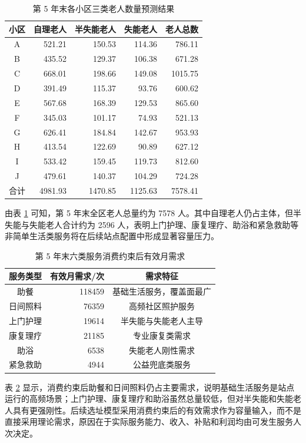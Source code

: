 \begin{table}[H]
\centering
\caption{第 5 年末各小区三类老人数量预测结果}
\label{tab:pop5}
\begin{tabular}{c r r r r}
\toprule
小区 & 自理老人 & 半失能老人 & 失能老人 & 老人总数 \\
\midrule
A & 521.21 & 150.53 & 114.36 & 786.11 \\
B & 435.52 & 129.37 & 106.38 & 671.28 \\
C & 668.01 & 198.66 & 149.08 & 1015.75 \\
D & 391.49 & 115.37 & 93.76 & 600.62 \\
E & 567.68 & 168.39 & 129.53 & 865.60 \\
F & 345.03 & 101.17 & 74.93 & 521.13 \\
G & 626.41 & 184.84 & 142.67 & 953.93 \\
H & 413.54 & 122.69 & 90.89 & 627.12 \\
I & 533.42 & 159.45 & 119.73 & 812.60 \\
J & 479.61 & 140.37 & 104.29 & 724.28 \\
\midrule
合计 & 4981.93 & 1470.85 & 1125.63 & 7578.41 \\
\bottomrule
\end{tabular}
\end{table}

由表 \ref{tab:pop5} 可知，第 5 年末全区老人总量约为 7578 人。其中自理老人仍占主体，但半失能与失能老人合计约为 2596 人，表明上门护理、康复理疗、助浴和紧急救助等非简单生活类服务将在后续站点配置中形成显著容量压力。

\begin{table}[H]
\centering
\caption{第 5 年末六类服务消费约束后有效月需求}
\label{tab:demand_summary}
\begin{tabular}{c r c}
\toprule
服务类型 & 有效月需求/次 & 需求特征 \\
\midrule
助餐 & 118459 & 基础生活服务，覆盖面最广 \\
日间照料 & 76359 & 高频社区照护服务 \\
上门护理 & 19614 & 半失能与失能老人主导 \\
康复理疗 & 21185 & 专业康复类需求 \\
助浴 & 6538 & 失能老人刚性需求 \\
紧急救助 & 4944 & 公益兜底类服务 \\
\bottomrule
\end{tabular}
\end{table}

表 \ref{tab:demand_summary} 显示，消费约束后助餐和日间照料仍占主要需求，说明基础生活服务是站点运行的高频场景；上门护理、康复理疗和助浴虽然总量较低，但对半失能和失能老人具有更强刚性。后续选址模型采用消费约束后的有效需求作为容量输入，而不是直接采用理论需求，原因在于实际服务能力、收入、补贴和利润均由可发生服务人次决定。
